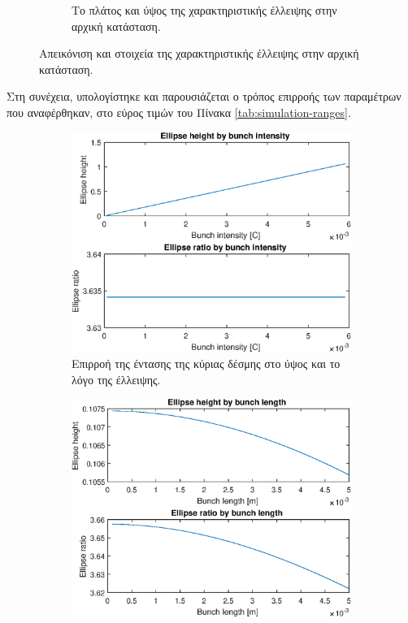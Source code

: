 \begin{figure}[tph]
\begin{subfigure}{0.47\textwidth}
		\centering
		\caption{Το πλάτος και ύψος της χαρακτηριστικής έλλειψης στην αρχική κατάσταση.}
		\label{fig:MATLAB-variable-analysis-initial-ellipse-height-width}
	\end{subfigure}
\caption{Απεικόνιση και στοιχεία της χαρακτηριστικής έλλειψης στην αρχική κατάσταση.}
\label{fig:MATLAB-initial-ellipse}
\end{figure}

Στη συνέχεια, υπολογίστηκε και παρουσιάζεται ο τρόπος επιρροής των παραμέτρων που αναφέρθηκαν, στο εύρος τιμών του Πίνακα \ref{tab:simulation-ranges}.


\begin{figure}[tph]	
	\centering
	\begin{subfigure}{0.47\textwidth}
		\includegraphics[width=\linewidth]{figures/MATLAB-variable-analysis/EBS-variables-intensity}
		\centering
		\caption{Επιρροή της έντασης της κύριας δέσμης στο ύψος και το λόγο της έλλειψης.}
		\label{fig:EBS-variables-intensity}
	\end{subfigure}
	\hfill
	\begin{subfigure}{0.47\textwidth}
		\includegraphics[width=\linewidth]{figures/MATLAB-variable-analysis/EBS-variables-length}

\end{subfigure}
\end{figure}
